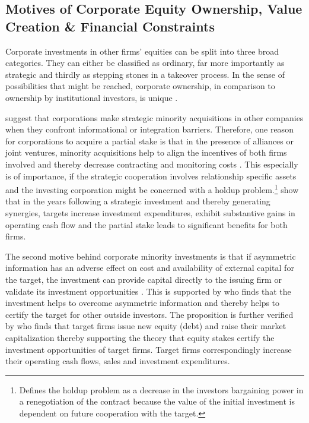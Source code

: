 \documentclass[12pt]{article}
\begin{document}
\subsection{Motives of Corporate Equity Ownership, Value Creation \& Financial Constraints}

\noindent Corporate investments in other firms' equities can be split into three broad categories. They can either be classified as ordinary, far more importantly as strategic and thirdly as stepping stones in a takeover process. 
In the sense of possibilities that might be reached, corporate ownership, in comparison to ownership by institutional investors, is unique \citep[p.2791]{Allen2000}.

\citet[p.1]{Huang2017} suggest that corporations make strategic minority acquisitions in other companies when they confront informational or integration barriers. 
Therefore, one reason for corporations to acquire a partial stake is that in the presence of alliances or joint ventures, minority acquisitions help to align the incentives of both firms involved and thereby decrease contracting and monitoring costs \citep[p.2792]{Allen2000}. This especially is of importance, if the strategic cooperation involves relationship specific assets and the investing corporation might be concerned with a holdup problem.\footnote{\citet[p.1023]{Ouimet2013} Defines the holdup problem as a decrease in the investors bargaining power in a renegotiation of the contract because the value of the initial investment is dependent on future cooperation with the target.} \citet[p. 2793]{Allen2000} show that in the years following a strategic investment and thereby generating synergies,  targets increase investment expenditures, exhibit substantive gains in operating cash flow and the partial stake leads to significant benefits for both firms.\par
The second motive behind corporate minority investments is that if asymmetric information has an adverse effect on cost and availability of external capital for the target, the investment can provide capital directly to the issuing firm or validate its investment opportunities \citep[p.2792]{Allen2000}. This is supported by \citet[p.1038]{Ouimet2013} who finds that the investment helps to overcome asymmetric information and thereby helps to certify the target for other outside investors. The proposition is further verified by \citet[p.78]{Liao2014} who finds that target firms issue new equity (debt) and raise their market capitalization thereby supporting the theory that equity stakes certify the investment opportunities of target firms. Target firms correspondingly increase their operating cash flows, sales and investment expenditures.\par
\end{document}
